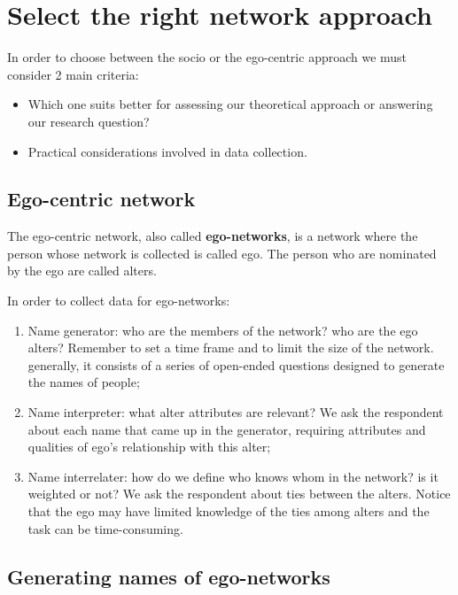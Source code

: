 \documentclass[
  notitlepage,
  onecolumn,
  openany]{book}
\providecommand{\tightlist}{%
  \setlength{\itemsep}{0pt}\setlength{\parskip}{0pt}}
\begin{document}
\hypertarget{select-the-right-network-approach}{%
\section{Select the right network approach}\label{select-the-right-network-approach}}

In order to choose between the socio or the ego-centric approach we must consider 2 main criteria:

\begin{itemize}
\tightlist
\item
  Which one suits better for assessing our theoretical approach or answering our research question?
\item
  Practical considerations involved in data collection.
\end{itemize}

\hypertarget{ego-centric-network}{%
\subsection{Ego-centric network}\label{ego-centric-network}}

The ego-centric network, also called \textbf{ego-networks}, is a network where the person whose network is collected is called ego. The person who are nominated by the ego are called alters.

In order to collect data for ego-networks:

\begin{enumerate}
\def\labelenumi{\arabic{enumi}.}
\tightlist
\item
  Name generator: who are the members of the network? who are the ego alters? Remember to set a time frame and to limit the size of the network. generally, it consists of a series of open-ended questions designed to generate the names of people;
\item
  Name interpreter: what alter attributes are relevant? We ask the respondent about each name that came up in the generator, requiring attributes and qualities of ego's relationship with this alter;
\item
  Name interrelater: how do we define who knows whom in the network? is it weighted or not? We ask the respondent about ties between the alters. Notice that the ego may have limited knowledge of the ties among alters and the task can be time-consuming.
\end{enumerate}

\hypertarget{generating-names-of-ego-networks}{%
\subsection{Generating names of ego-networks}\label{generating-names-of-ego-networks}}
\end{document}
